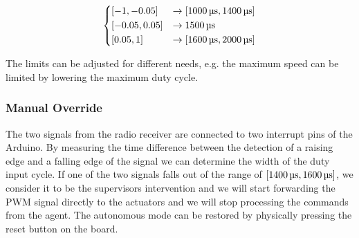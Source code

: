 \[
	\begin{dcases}
		\interval{-1}{-0.05} & \rightarrow \interval{\SI{1000}{\micro\second}}{\SI{1400}{\micro\second}} \\
		\interval{-0.05}{0.05} & \rightarrow \SI{1500}{\micro\second} \\
		\interval{0.05}{1} & \rightarrow \interval{\SI{1600}{\micro\second}}{ \SI{2000}{\micro\second}}
	\end{dcases}
\]

The limits can be adjusted for different needs, e.g. the maximum speed can be limited by lowering the maximum duty cycle.

\subsubsection{Manual Override}

The two signals from the radio receiver are connected to two interrupt pins of the Arduino. By measuring the time difference between the detection of a raising edge and a falling edge of the signal we can determine the width of the duty input cycle. If one of the two signals falls out of the range of $\interval{\SI{1400}{\micro\second}}{\SI{1600}{\micro\second}}$, we consider it to be the supervisors intervention and we will start forwarding the \gls*{PWM} signal directly to the actuators and we will stop processing the commands from the agent. The autonomous mode can be restored by physically pressing the reset button on the board.